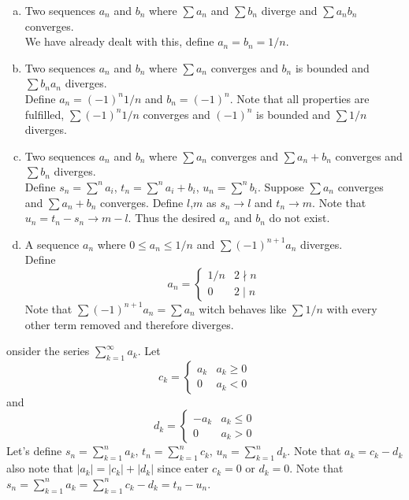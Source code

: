 \documentclass[12pt]{article}
\makeatletter
\theoremstyle{homework}
\newenvironment{exercise}[1]
{\def\@currentlabel{#1}\exercisecore}
{\endexercisecore}
\makeatother
\begin{document}
\begin{enumerate}[(a)]
\item
Two sequences $a_n$ and $b_n$ where $\sum a_n$ and $\sum b_n$ diverge and $\sum a_nb_n$ converges.\\
We have already dealt with this, define $a_n=b_n=1/n$.
\item
Two sequences $a_n$ and $b_n$ where $\sum a_n$ converges and $b_n$ is bounded and $\sum b_na_n$ diverges.\\
Define $a_n=(-1)^n1/n$ and $b_n=(-1)^n$.  Note that all properties are fulfilled, $\sum (-1)^n1/n$ converges and $(-1)^n$ is bounded and $\sum 1/n$ diverges.
\item
Two sequences $a_n$ and $b_n$ where $\sum a_n$ converges and $\sum a_n+b_n$ converges and $\sum b_n$ diverges.\\
Define $s_n=\sum^n a_i$, $t_n=\sum^n a_i+b_i$, $u_n=\sum^n b_i$.  Suppose $\sum a_n$ converges and $\sum a_n+b_n$ converges.  Define $l$,$m$ as $s_n\rightarrow l$ and $t_n\rightarrow m$.  Note that $u_n=t_n-s_n\rightarrow m-l$.  Thus the desired $a_n$ and $b_n$ do not exist.
\item
A sequence $a_n$ where $0\leq a_n\leq 1/n$ and $\sum (-1)^{n+1}a_n$ diverges.\\
Define 
$$a_n=\begin{cases}
1/n & 2\nmid n\\
0 & 2\mid n
\end{cases}$$
Note that $\sum (-1)^{n+1}a_n=\sum a_n$ witch behaves like $\sum 1/n$ with every other term removed and therefore diverges.
\end{enumerate}
\begin{exercise}

Consider the series $\sum_{k=1}^\infty a_k$. Let
$$c_k =\begin{cases}
a_k & a_k \geq 0\\
0 & a_k < 0
\end{cases}$$
and
$$d_k =\begin{cases}
-a_k & a_k \leq 0\\
0 & a_k > 0
\end{cases}$$
\end{exercise}
Let's define $s_n=\sum_{k=1}^n a_k$, $t_n=\sum^{n}_{k=1} c_k$, $u_n=\sum^{n}_{k=1} d_k$.  Note that $a_k=c_k-d_k$ also note that $|a_k|=|c_k|+|d_k|$ since eater $c_k=0$ or $d_k=0$.  Note that $s_n=\sum_{k=1}^n a_k=\sum_{k=1}^n c_k-d_k=t_n-u_n$.
\end{document}
